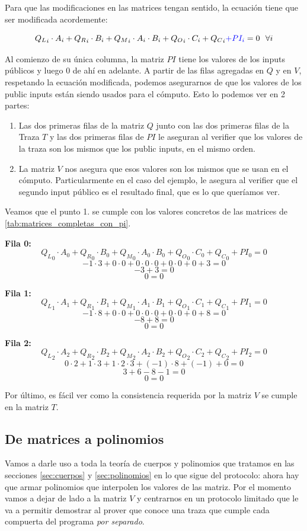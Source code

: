 Para que las modificaciones en las matrices tengan sentido, la ecuación tiene que ser modificada acordemente:

$${Q_L}_i \cdot A_i + {Q_R}_i \cdot B_i + {Q_M}_i\cdot A_i\cdot B_i + {Q_O}_i\cdot C_i + {Q_C}_i \textcolor{blue}{+ PI_i} = 0 ~~ \forall i$$

Al comienzo de su única columna, la matriz $PI$ tiene los valores de los inputs públicos y luego 0 de ahí en adelante. A partir de las filas agregadas en $Q$ y en $V$, respetando la ecuación modificada, podemos asegurarnos de que los valores de los public inputs están siendo usados para el cómputo. Esto lo podemos ver en 2 partes:
\begin{enumerate}
    \item Las dos primeras filas de la matriz $Q$ junto con las dos primeras filas de la Traza $T$ y las dos primeras filas de $PI$ le aseguran al verifier que los valores de la traza son los mismos que los public inputs, en el mismo orden.
    \item La matriz $V$ nos asegura que esos valores son los mismos que se usan en el cómputo. Particularmente en el caso del ejemplo, le asegura al verifier que el segundo input público es el resultado final, que es lo que queríamos ver.
\end{enumerate}

Veamos que el punto 1. se cumple con los valores concretos de las matrices de \ref{tab:matrices_completas_con_pi}.

\textbf{Fila 0:}
$${Q_L}_0 \cdot A_0 + {Q_R}_0 \cdot B_0 + {Q_M}_0\cdot A_0\cdot B_0 + {Q_O}_0\cdot C_0 + {Q_C}_0 + PI_0 = 0$$
$$-1 \cdot 3 + 0 \cdot 0 + 0\cdot 0\cdot 0 + 0\cdot 0 + 0 + 3 = 0$$
$$-3 + 3 = 0$$
$$0 = 0$$

\textbf{Fila 1:}
$${Q_L}_1 \cdot A_1 + {Q_R}_1 \cdot B_1 + {Q_M}_1\cdot A_1\cdot B_1 + {Q_O}_1\cdot C_1 + {Q_C}_1 + PI_1 = 0$$
$$-1 \cdot 8 + 0 \cdot 0 + 0\cdot 0\cdot 0 + 0\cdot 0 + 0 + 8 = 0$$
$$-8 + 8 = 0$$
$$0 = 0$$

\textbf{Fila 2:}
$${Q_L}_2 \cdot A_2 + {Q_R}_2 \cdot B_2 + {Q_M}_2\cdot A_2\cdot B_2 + {Q_O}_2\cdot C_2 + {Q_C}_2 + PI_2 = 0$$
$$0 \cdot 2 + 1 \cdot 3 + 1\cdot 2\cdot 3 + (-1)\cdot 8 + (-1) + 0 = 0$$
$$3+6-8-1=0$$
$$0=0$$

Por último, es fácil ver como la consistencia requerida por la matriz $V$ se cumple en la matriz $T$.

\subsection{De matrices a polinomios}
Vamos a darle uso a toda la teoría de cuerpos y polinomios que tratamos en las secciones \ref{sec:cuerpos} y \ref{sec:polinomios} en lo que sigue del protocolo: ahora hay que armar polinomios que interpolen los valores de las matriz.  Por el momento vamos a dejar de lado a la matriz $V$ y centrarnos en un protocolo limitado que le va a permitir demostrar al prover que conoce una traza que cumple cada compuerta del programa \textit{por separado}. 

